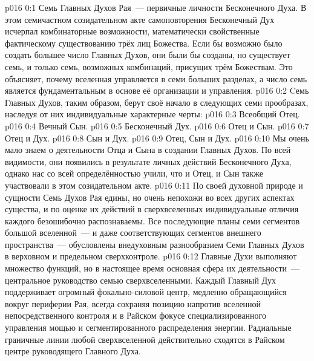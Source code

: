 \author{Всеобщий Цензор}
\vs p016 0:1 Семь Главных Духов Рая~--- первичные личности Бесконечного Духа. В этом семичастном созидательном акте самоповторения Бесконечный Дух исчерпал комбинаторные возможности, математически свойственные фактическому существованию трёх лиц Божества. Если бы возможно было создать большее число Главных Духов, они были бы созданы, но существует семь, и только семь, возможных комбинаций, присущих трём Божествам. Это объясняет, почему вселенная управляется в семи больших разделах, а число семь является фундаментальным в основе её организации и управления.
\vs p016 0:2 Cемь Главных Духов, таким образом, берут своё начало в следующих семи прообразах, наследуя от них индивидуальные характерные черты:
\vs p016 0:3 Всеобщий Отец.
\vs p016 0:4 Вечный Сын.
\vs p016 0:5 Бесконечный Дух.
\vs p016 0:6 Отец и Сын.
\vs p016 0:7 Отец и Дух.
\vs p016 0:8 Сын и Дух.
\vs p016 0:9 Отец, Сын и Дух.
\vs p016 0:10 \pc Мы очень мало знаем о деятельности Отца и Сына в создании Главных Духов. По всей видимости, они появились в результате личных действий Бесконечного Духа, однако нас со всей определённостью учили, что и Отец, и Сын также участвовали в этом созидательном акте.
\vs p016 0:11 По своей духовной природе и сущности Семь Духов Рая едины, но очень непохожи во всех других аспектах существа, и по оценке их действий в сверхвселенных индивидуальные отличия каждого безошибочно распознаваемы. Все последующие планы семи сегментов большой вселенной~--- и даже соответствующих сегментов внешнего пространства~--- обусловлены внедуховным разнообразием Семи Главных Духов в верховном и предельном сверхконтроле.
\vs p016 0:12 Главные Духи выполняют множество функций, но в настоящее время основная сфера их деятельности~--- центральное руководство семью сверхвселенными. Каждый Главный Дух поддерживает огромный фокально\hyp{}силовой центр, медленно обращающийся вокруг периферии Рая, всегда сохраняя позицию напротив вселенной непосредственного контроля и в Райском фокусе специализированного управления мощью и сегментированного распределения энергии. Радиальные граничные линии любой сверхвселенной действительно сходятся в Райском центре руководящего Главного Духа.
